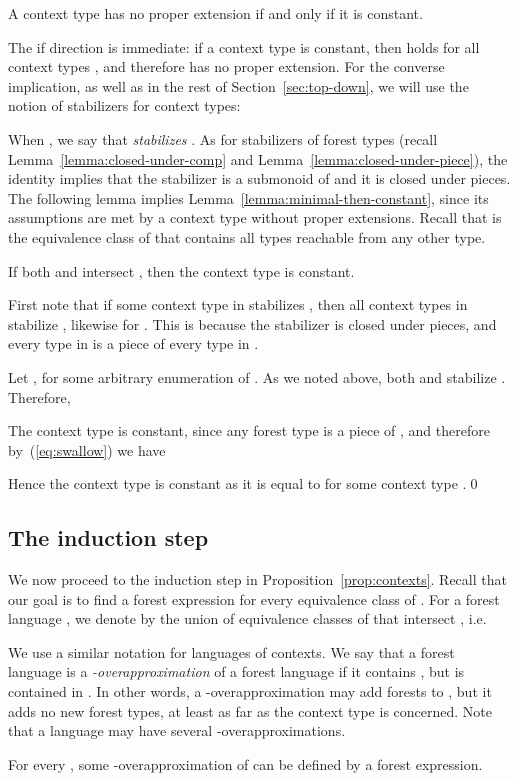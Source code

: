 \documentclass{LMCS}
\begin{document}
\begin{lem}\label{lemma:minimal-then-constant}
  A context type has no proper extension if and only if it is constant.
\end{lem}

The if direction is immediate: if a context type  is constant, then
 holds for all context types , and therefore  has no
proper extension. For the converse implication, as well as in the rest
of Section~\ref{sec:top-down}, we will use the notion of stabilizers
for context types:

When , we say that \emph{ stabilizes }.  As for
stabilizers of forest types (recall Lemma~\ref{lemma:closed-under-comp} and
Lemma~\ref{lemma:closed-under-piece}), the  identity implies that the
stabilizer  is a submonoid of  and it is closed under pieces.  The
following lemma implies Lemma~\ref{lemma:minimal-then-constant}, since its
assumptions are met by a context type without proper extensions.
Recall that
 is the equivalence class of  that contains all types reachable
from any other type.




\begin{lem}\label{lemma:at-least-one-disjoint}
  If both  and  intersect , then
  the context type  is constant.
\end{lem}
\proof
  First note that if some context type in 
  stabilizes , then all context types in 
  stabilize , likewise for . This is because the
  stabilizer is closed under pieces, and every type in  is
  a piece of every type in .

  
 Let , for some arbitrary enumeration  of . As we
  noted above, both  and  stabilize . Therefore,
  
  The context type  is constant,
  since any forest type  is a piece of , and therefore
  by~(\ref{eq:swallow}) we have
  
Hence the context type  is constant as it is equal to  for some context type .\qed


\subsection{The induction step}
We now proceed to the induction step in
Proposition~\ref{prop:contexts}.  Recall that our goal is to find a
 forest expression for every equivalence class of
. For a forest language , we denote by  the union
of equivalence classes of  that intersect , i.e.

We use a similar notation  for languages of contexts.  We say
that a forest language is a \emph{-overapproximation}
of a forest language  if it contains , but is contained in
. In other words, a -overapproximation may add forests to
, but it adds no new forest types, at least as far as the context
type  is concerned.  Note that a language may have several
-overapproximations.
\begin{prop}\label{prop:overapprox}
  For every , some -overapproximation of  can be
  defined by a  forest expression.
\end{prop}
\end{document}
